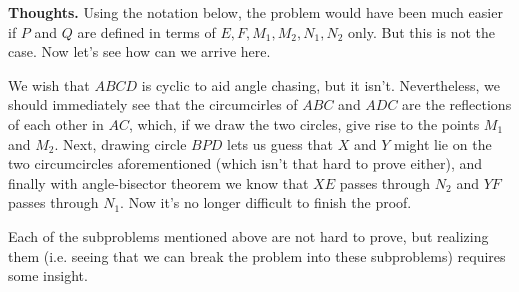 \documentclass[11pt,a4paper]{article}
\begin{document}
\begin{itemize}
\textbf{Thoughts.} Using the notation below, the problem would have been much easier if $P$ and $Q$ are defined in terms of $E, F, M_1, M_2, N_1, N_2$ only. But this is not the case. Now let's see how can we arrive here. 

We wish that $ABCD$ is cyclic to aid angle chasing, but it isn't. Nevertheless, we should immediately see that the circumcirles of $ABC$ and $ADC$ are the reflections of each other in $AC$, which, if we draw the two circles, give rise to the points $M_1$ and $M_2$. Next, drawing circle $BPD$ lets us guess that $X$ and $Y$ might lie on the two circumcircles aforementioned (which isn't that hard to prove either), and finally with angle-bisector theorem we know that $XE$ passes through $N_2$ and $YF$ passes through $N_1$. Now it's no longer difficult to finish the proof. 

Each of the subproblems mentioned above are not hard to prove, but realizing them (i.e. seeing that we can break the problem into these subproblems) requires some insight.


\end{itemize}
\end{document}
